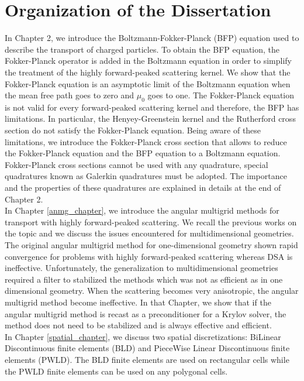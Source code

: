 \section{Organization of the Dissertation}
\noindent In Chapter 2, we introduce the Boltzmann-Fokker-Planck (BFP)
equation used to describe the transport of charged particles. To obtain the
BFP equation, the Fokker-Planck operator is added in the Boltzmann equation in 
order to simplify
the treatment of the highly forward-peaked scattering kernel. We show that the
Fokker-Planck equation is an asymptotic limit of the Boltzmann equation when the
mean free path goes to zero and $\mu_0$ goes to one. The Fokker-Planck
equation is not valid for every forward-peaked scattering kernel and
therefore, the BFP has limitations. In particular, the Henyey-Greenstein kernel
and the Rutherford cross section do not satisfy the Fokker-Planck equation.
Being aware of these limitations, we introduce the Fokker-Planck cross
section that allows to reduce the Fokker-Planck equation and the BFP equation
to a Boltzmann equation. Fokker-Planck cross sections cannot be used with any
quadrature, special quadratures known as Galerkin quadratures must be adopted.
The importance and the properties of these quadratures are explained in
details at the end of Chapter 2.\\

\noindent In Chapter \ref{anmg_chapter}, we introduce the angular multigrid 
methods for transport with highly forward-peaked scattering. We recall the 
previous works on the topic and we discuss the issues encountered for 
multidimensional geometries. The original angular multigrid method for 
one-dimensional geometry shown rapid convergence for problems with highly 
forward-peaked scattering whereas DSA is ineffective. Unfortunately, the 
generalization to multidimensional geometries required a filter to stabilized 
the methods which was not as efficient as in one dimensional geometry. When 
the scattering becomes very anisotropic, the angular multigrid method become 
ineffective. In that Chapter, we show that if the angular multigrid method is 
recast as a preconditioner for a Krylov solver, the method does not need to be 
stabilized and is always effective and efficient.\\

\noindent In Chapter \ref{spatial_chapter}, we discuss two spatial 
discretizations: BiLinear Discontinuous finite elements (BLD) and PieceWise 
Linear Discontinuous finite elements (PWLD). The BLD finite elements are used 
on rectangular cells while the PWLD finite elements can be used on any polygonal 
cells.\\

